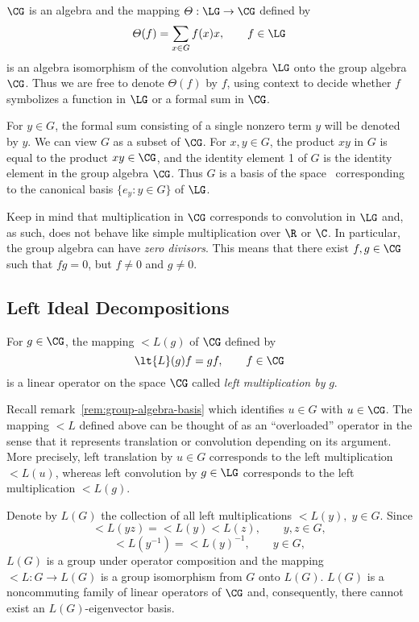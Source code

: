 $\CG$ is an algebra and the mapping $\varTheta: \LG \to \CG$ defined by
\[
\varTheta(f) = \sum_{x\in G} f(x) x, \qquad f\in \LG
\]
is an algebra isomorphism of the convolution algebra $\LG$ onto the group
algebra $\CG$.  Thus we are free to denote $\varTheta(f)$ by $f$, using 
context to decide whether $f$ symbolizes a function in $\LG$
or a formal sum in $\CG$. 

\begin{remark}\label{rem:group-algebra-basis}
For $y\in G$, the formal sum consisting of a single nonzero term $y$ will be
denoted by $y$.  We can view $G$ as a subset of $\CG$.  For $x, y \in G$, the
product $xy$ in $G$ is equal to the product $xy \in \CG$, and the identity
element 1  of $G$ is the identity element in the group algebra $\CG$.  Thus
$G$ is a basis of the space \CG\ corresponding to the canonical basis $\{e_y :
y\in G \}$ of $\LG$.
\end{remark}

\begin{remark}
Keep in mind that multiplication in $\CG$ corresponds to convolution in $\LG$
and, as such, does not behave like simple multiplication over $\R$ or $\C$.
In particular, the group algebra can have \emph{zero divisors}.  This means
that there exist $f, g \in \CG$ such that $fg = 0$, but $f\neq 0$ and $g \neq 0$.
\end{remark}

\subsection{Left Ideal Decompositions}
For $g\in \CG$, the mapping $\lt{L}(g)$ of $\CG$ defined by 
\[
\lt{L}(g)f = gf, \qquad f\in \CG
\]
is a linear operator on the space $\CG$ called \emph{left multiplication by}
$g$.  

Recall remark~\ref{rem:group-algebra-basis} which identifies $u \in G$ with $u\in
\CG$.  The mapping $\lt{L}$ defined above can be thought of as an ``overloaded''
operator in the sense that it represents translation or 
convolution depending on its argument.  More precisely, left translation by
$u\in G$ corresponds to the left multiplication $\lt{L}(u)$, whereas 
left convolution by $g \in \LG$ corresponds to the left multiplication $\lt{L}(g)$.

Denote by $L(G)$ the collection of all left multiplications $\lt{L}(y),\; y\in G$.
Since 
\[
\lt{L}(yz) = \lt{L}(y)\lt{L}(z), \qquad y, z \in G,
\]
\[
\lt{L}(y^{-1}) = \lt{L}(y)^{-1}, \qquad y \in G,
\]
$L(G)$ is a group under operator composition and the mapping $\lt{L}: G\to
L(G)$ is a group isomorphism from $G$ onto $L(G)$.  $L(G)$ is a noncommuting
family of linear operators of $\CG$ and, consequently, there cannot exist an
$L(G)$-eigenvector basis.  

